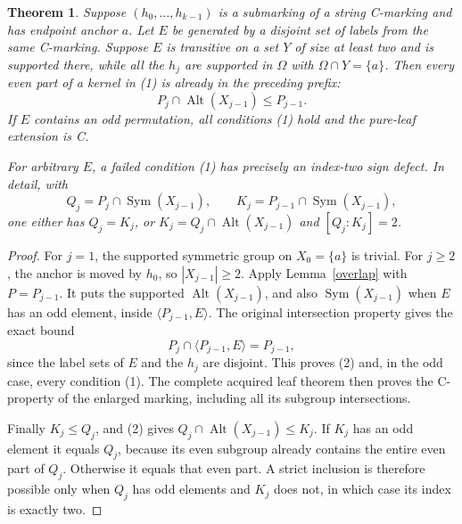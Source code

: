 \documentclass[11pt,a4paper]{article}
\newtheorem{theorem}[lemma]{Theorem}
\newcommand{\gen}[1]{\langle#1\rangle}
\newcommand{\Sym}{\operatorname{Sym}}
\newcommand{\Alt}{\operatorname{Alt}}
\begin{document}
\begin{theorem}\label{kernels}
Suppose $(h_0,\ldots,h_{k-1})$ is a submarking of a string
C-marking and has endpoint anchor $a$. Let $E$ be generated by
a disjoint set of labels from the same C-marking. Suppose $E$ is
transitive on a set $Y$ of size at least two and is supported there,
while all the $h_j$ are supported in $\Omega$ with
$\Omega\cap Y=\{a\}$. Then every even part of a kernel in (1)
is already in the preceding prefix:
\[
 P_j\cap\Alt(X_{j-1})\le P_{j-1}.                    \tag{2}
\]
If $E$ contains an odd permutation, all conditions (1) hold and
the pure-leaf extension is C.

For arbitrary $E$, a failed condition (1) has precisely an index-two
sign defect. In detail, with
\[
 Q_j=P_j\cap\Sym(X_{j-1}),\qquad
 K_j=P_{j-1}\cap\Sym(X_{j-1}),
\]
one either has $Q_j=K_j$, or
$K_j=Q_j\cap\Alt(X_{j-1})$ and $[Q_j:K_j]=2$.
\end{theorem}
\begin{proof}
For $j=1$, the supported symmetric group on $X_0=\{a\}$
is trivial. For $j\ge2$, the anchor is moved by $h_0$, so
$|X_{j-1}|\ge2$. Apply Lemma~\ref{overlap} with $P=P_{j-1}$.
It puts the supported $\Alt(X_{j-1})$, and also
$\Sym(X_{j-1})$ when $E$ has an odd element, inside
$\gen{P_{j-1},E}$.
The original intersection property gives the exact bound
\[
 P_j\cap\gen{P_{j-1},E}=P_{j-1},
\]
since the label sets of $E$ and the $h_j$ are disjoint.
This proves (2) and, in the odd case, every condition (1).
The complete acquired leaf theorem then proves the C-property of
the enlarged marking, including all its subgroup intersections.

Finally $K_j\le Q_j$, and (2) gives
$Q_j\cap\Alt(X_{j-1})\le K_j$.
If $K_j$ has an odd element it equals $Q_j$, because its even
subgroup already contains the entire even part of $Q_j$.
Otherwise it equals that even part. A strict inclusion is therefore
possible only when $Q_j$ has odd elements and $K_j$ does not,
in which case its index is exactly two.
\end{proof}
\end{document}
